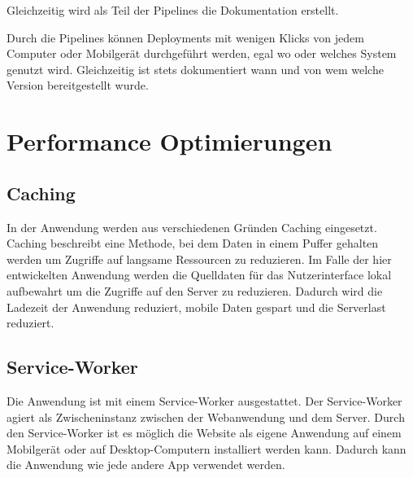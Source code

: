Gleichzeitig wird als Teil der Pipelines die Dokumentation erstellt.

Durch die Pipelines können Deployments mit wenigen Klicks von jedem Computer oder Mobilgerät durchgeführt werden, egal wo oder welches System genutzt wird.
Gleichzeitig ist stets dokumentiert wann und von wem welche Version bereitgestellt wurde.







\section{Performance Optimierungen}
\subsection{Caching}
In der Anwendung werden aus verschiedenen Gründen Caching eingesetzt.
Caching beschreibt eine Methode, bei dem Daten in einem Puffer gehalten werden um Zugriffe auf langsame Ressourcen zu reduzieren.
Im Falle der hier entwickelten Anwendung werden die Quelldaten für das Nutzerinterface lokal aufbewahrt um die Zugriffe auf den Server zu reduzieren.
Dadurch wird die Ladezeit der Anwendung reduziert, mobile Daten gespart und die Serverlast reduziert.






\subsection{Service-Worker}
Die Anwendung ist mit einem Service-Worker ausgestattet.
Der Service-Worker agiert als Zwischeninstanz zwischen der Webanwendung und dem Server.
Durch den Service-Worker ist es möglich die Website als eigene Anwendung auf einem Mobilgerät oder auf Desktop-Computern installiert werden kann.
Dadurch kann die Anwendung wie jede andere App verwendet werden.




